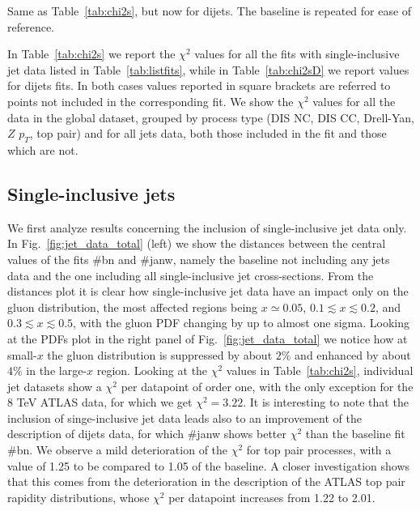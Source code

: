 \begin{table}[t]
    \renewcommand*{\arraystretch}{1.60}
    \scriptsize
    \centering
    
    \vspace{0.3cm}
    \caption{Same as Table~\ref{tab:chi2s}, but now for dijets. The
      baseline is repeated for ease of reference.}
    \label{tab:chi2sD}
\end{table}


%
In Table~\ref{tab:chi2s} we report the $\chi^2$ values for all the fits with single-inclusive jet data listed in 
Table~\ref{tab:listfits}, while in Table~\ref{tab:chi2sD} we report values for dijets fits.
In both cases values reported in square brackets are referred to points not included in the corresponding fit. 
We show the $\chi^2$ values for all the data in the global dataset, grouped by process type 
(DIS NC, DIS CC, Drell-Yan, $Z\,\,p_T$, top pair) and for all jets data, both those included in the fit 
and those which are not.
 

\subsection{Single-inclusive jets}
\label{sec:single_jet}
We first analyze results concerning the inclusion of single-inclusive jet data only.
In Fig.~\ref{fig:jet_data_total} (left) we show the distances between the central values of the fits \#bn and \#janw, 
namely the baseline not including any jets data and the one including all single-inclusive jet cross-sections.
From the distances plot it is clear how single-inclusive jet data have an impact only on the gluon distribution,
the most affected regions being $x\simeq 0.05$, $0.1\lesssim x \lesssim 0.2$, and
$0.3\lesssim x\lesssim 0.5$, with the gluon PDF changing by up to almost one sigma. 
Looking at the PDFs plot in the right panel of Fig.~\ref{fig:jet_data_total} we notice how at small-$x$ 
the gluon distribution is suppressed by about $2\%$ and enhanced by about $4\%$ in the large-$x$ region.
%
Looking at the $\chi^2$ values in Table~\ref{tab:chi2s}, individual jet datasets show a $\chi^2$ per datapoint 
of order one, with the only exception for the 8 TeV ATLAS data, for which we get $\chi^2 = 3.22$.
It is interesting to note that the inclusion of singe-inclusive jet data leads also to an improvement 
of the description of dijets data, for which \#janw shows better $\chi^2$ than the baseline fit \#bn.
%   
We observe a mild deterioration of the $\chi^2$ for top pair processes, with a value of 1.25 to be compared to
1.05 of the baseline. A closer investigation shows that this comes from the deterioration in the description 
of the ATLAS top pair rapidity distributions, whose $\chi^2$ per datapoint increases from 1.22 to 2.01.

